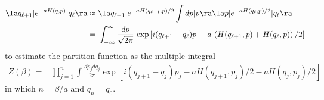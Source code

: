 \documentclass[prd,preprint,floatfix,showpacs]{revtex4-1}
\begin{document}
\begin{equation}
\begin{split}
\la q_{\ell+1} | e^{-a H(q, p)} | q_\ell \ra
\approx {}& 
\la q_{\ell+1} | e^{-a H(q_{\ell+1}, p)/2} 
\int dp |p\ra \la p |  e^{-a H(q_\ell, p)/2} | q_\ell \ra
\\
= {}& 
\int_{-\infty}^\infty \frac{dp}{\sqrt{2\pi}} \,
\exp \left[i (q_{\ell+1} - q_\ell) p \, 
- a \, \left( H(q_{\ell+1}, p) + H(q_\ell, p) \right)/2\right] 
\label {using the approximation}
\end{split}
\end{equation}
to estimate the partition function as
the multiple integral
\begin{equation}
\begin{split}
Z(\beta)={}& \prod_{j=1}^{n} \int \frac{dp_j dq_j}{2\pi} 
 \exp \left[  i (q_{j+1} - q_j) p_j 
 - a H(q_{j+1},p_j)/2 - a H(q_j,p_j)/2 \right]   
 \label {The partition function then is}
    \end{split}
\end{equation}
in which \( n = \beta/a \) and \( q_n = q_0 \)\@.
\end{document}
